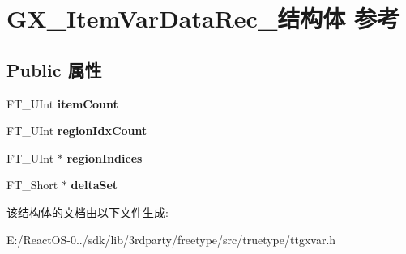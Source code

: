 \hypertarget{struct_g_x___item_var_data_rec__}{}\section{G\+X\+\_\+\+Item\+Var\+Data\+Rec\+\_\+结构体 参考}
\label{struct_g_x___item_var_data_rec__}
\subsection*{Public 属性}
\begin{DoxyCompactItemize}
\item 
\mbox{\label{struct_g_x___item_var_data_rec___a46b17560fb00dbe053cb0f71b80274de}} 
F\+T\+\_\+\+U\+Int {\bfseries item\+Count}
\item 
\mbox{\label{struct_g_x___item_var_data_rec___a13811318252dabaa12870c1aa3bddef4}} 
F\+T\+\_\+\+U\+Int {\bfseries region\+Idx\+Count}
\item 
\mbox{\label{struct_g_x___item_var_data_rec___a6f97608e848daaf73680bb94b82f049a}} 
F\+T\+\_\+\+U\+Int $\ast$ {\bfseries region\+Indices}
\item 
\mbox{\label{struct_g_x___item_var_data_rec___a25146188eb47df98efea50e525282fb3}} 
F\+T\+\_\+\+Short $\ast$ {\bfseries delta\+Set}
\end{DoxyCompactItemize}


该结构体的文档由以下文件生成\+:\begin{DoxyCompactItemize}
\item 
E\+:/\+React\+O\+S-\/0../sdk/lib/3rdparty/freetype/src/truetype/ttgxvar.\+h\end{DoxyCompactItemize}

